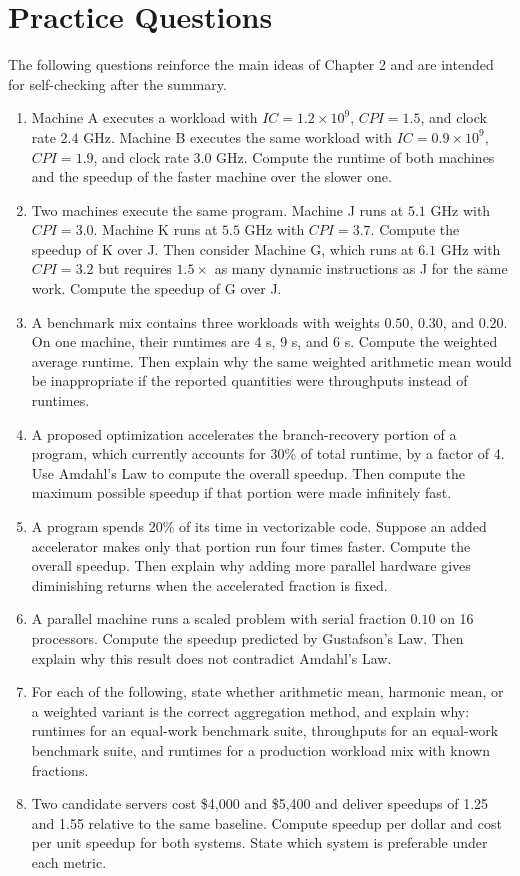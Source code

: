 \section{Practice Questions}\label{sec:ch2-practice}
The following questions reinforce the main ideas of Chapter 2 and are intended for self-checking after the summary.
\begin{enumerate}
    \item Machine A executes a workload with $IC=1.2\times 10^9$, $CPI=1.5$, and clock rate $2.4$ GHz. Machine B executes the same workload with $IC=0.9\times 10^9$, $CPI=1.9$, and clock rate $3.0$ GHz. Compute the runtime of both machines and the speedup of the faster machine over the slower one.
    \item Two machines execute the same program.
    Machine J runs at $5.1$ GHz with $CPI=3.0$.
    Machine K runs at $5.5$ GHz with $CPI=3.7$.
    Compute the speedup of K over J. Then consider Machine G, which runs at $6.1$ GHz with $CPI=3.2$ but requires $1.5\times$ as many dynamic instructions as J for the same work.
    Compute the speedup of G over J\@.
    \item A benchmark mix contains three workloads with weights $0.50$, $0.30$, and $0.20$.
    On one machine, their runtimes are 4 s, 9 s, and 6 s.
    Compute the weighted average runtime.
    Then explain why the same weighted arithmetic mean would be inappropriate if the reported quantities were throughputs instead of runtimes.
    \item A proposed optimization accelerates the branch-recovery portion of a program, which currently accounts for 30\% of total runtime, by a factor of 4.
    Use Amdahl's Law to compute the overall speedup.
    Then compute the maximum possible speedup if that portion were made infinitely fast.
    \item A program spends 20\% of its time in vectorizable code.
    Suppose an added accelerator makes only that portion run four times faster.
    Compute the overall speedup.
    Then explain why adding more parallel hardware gives diminishing returns when the accelerated fraction is fixed.
    \item A parallel machine runs a scaled problem with serial fraction $0.10$ on 16 processors.
    Compute the speedup predicted by Gustafson's Law.
    Then explain why this result does not contradict Amdahl's Law.
    \item For each of the following, state whether arithmetic mean, harmonic mean, or a weighted variant is the correct aggregation method, and explain why: runtimes for an equal-work benchmark suite, throughputs for an equal-work benchmark suite, and runtimes for a production workload mix with known fractions.
    \item Two candidate servers cost \$4{,}000 and \$5{,}400 and deliver speedups of 1.25 and 1.55 relative to the same baseline.
    Compute speedup per dollar and cost per unit speedup for both systems.
    State which system is preferable under each metric.
\end{enumerate}
